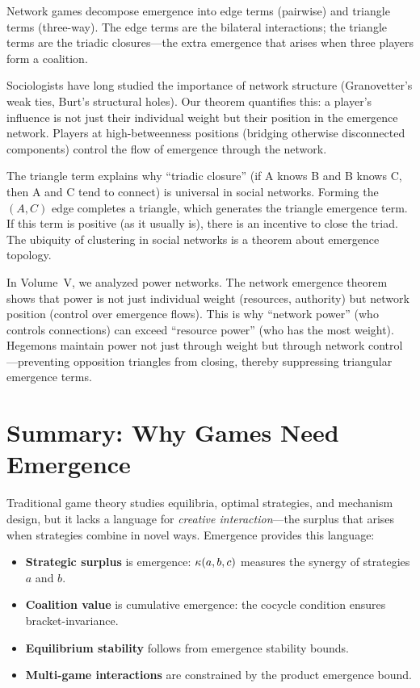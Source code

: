 \begin{interpretation}
Network games decompose emergence into edge terms (pairwise) and triangle terms
(three-way). The edge terms are the bilateral interactions; the triangle terms
are the triadic closures---the extra emergence that arises when three players
form a coalition.

Sociologists have long studied the importance of network structure (Granovetter's
weak ties, Burt's structural holes). Our theorem quantifies this: a player's
influence is not just their individual weight but their position in the emergence
network. Players at high-betweenness positions (bridging otherwise disconnected
components) control the flow of emergence through the network.

The triangle term explains why ``triadic closure'' (if A knows B and B knows C,
then A and C tend to connect) is universal in social networks. Forming the
$(A,C)$ edge completes a triangle, which generates the triangle emergence term.
If this term is positive (as it usually is), there is an incentive to close the
triad. The ubiquity of clustering in social networks is a theorem about emergence
topology.

In Volume~V, we analyzed power networks. The network emergence theorem shows
that power is not just individual weight (resources, authority) but network
position (control over emergence flows). This is why ``network power'' (who
controls connections) can exceed ``resource power'' (who has the most weight).
Hegemons maintain power not just through weight but through network control---preventing
opposition triangles from closing, thereby suppressing triangular emergence terms.
\end{interpretation}



\section{Summary: Why Games Need Emergence}

Traditional game theory studies equilibria, optimal strategies, and mechanism
design, but it lacks a language for \emph{creative interaction}---the surplus
that arises when strategies combine in novel ways. Emergence provides this
language:

\begin{itemize}
  \item \textbf{Strategic surplus} is emergence: $\kappa(a, b, c)$ measures the
    synergy of strategies $a$ and $b$.
  \item \textbf{Coalition value} is cumulative emergence: the cocycle condition
    ensures bracket-invariance.
  \item \textbf{Equilibrium stability} follows from emergence stability bounds.
  \item \textbf{Multi-game interactions} are constrained by the product emergence
    bound.
\end{itemize}

